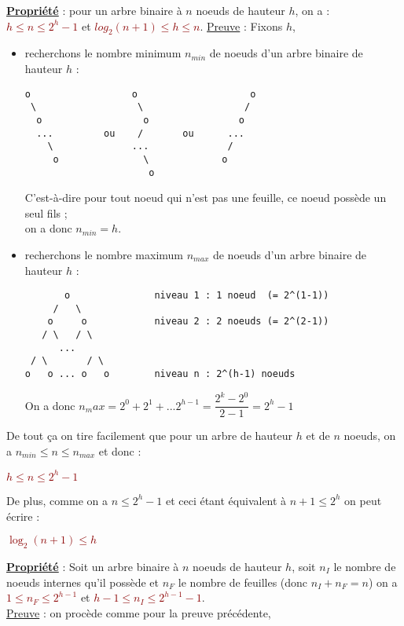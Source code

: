 \documentclass{article}
\newcommand{\red}[1]{\textcolor{darkred}{#1}}
\begin{document}
\noindent\textbf{\underline{Propriété}} : pour un arbre binaire à $n$ noeuds de hauteur $h$, on a : \red{$h\leq 
n\leq2^{h}-1$} et \red{$log_2(n+1)\leq h\leq n$}.
\underline{Preuve} : Fixons $h$,\\
\begin{itemize}
\item recherchons le nombre minimum $n_{min}$ de noeuds d'un arbre binaire de hauteur $h$ : 
\begin{lstlisting}
o                  o                    o
 \                  \                  /
  o                  o                o
  ...         ou    /       ou      ...
    \              ...              /
     o               \             o
                      o
\end{lstlisting}
C'est-à-dire pour tout noeud qui n'est pas une feuille, ce noeud possède un seul fils ; \\on a donc $n_{min}=h$.
\item recherchons le nombre maximum $n_{max}$ de noeuds d'un arbre binaire de hauteur $h$ : 
\begin{lstlisting}
       o               niveau 1 : 1 noeud  (= 2^(1-1))
     /   \
    o     o            niveau 2 : 2 noeuds (= 2^(2-1))
   / \   / \
      ...
 / \       / \ 
o   o ... o   o        niveau n : 2^(h-1) noeuds
\end{lstlisting}

On a donc $n_max = 2^0+2^1+...2^{h-1} = \dfrac{2^k-2^0}{2-1} = 2^h-1$
\end{itemize}

\noindent De tout ça on tire facilement que pour un arbre de hauteur $h$ et de $n$ noeuds, on a $n_{min} \leq n 
\leq n_{max}$ et donc : \red{\begin{center}$\boxed{h \leq n \leq 2^{h}-1}$\end{center}}
De plus, comme on a $n\leq 2^h-1$ et ceci étant équivalent à $n+1 \leq 2^h$ on peut écrire :  
\red{\begin{center}$\boxed{\log_2{(n+1)} \leq h}$\end{center}}

\noindent\textbf{\underline{Propriété}} : Soit un arbre binaire à $n$ noeuds de hauteur $h$, soit $n_I$ le 
nombre de noeuds internes qu'il possède et $n_F$ le nombre de feuilles (donc $n_I+n_F=n$) on a \red{$1\leq 
n_F\leq 2^{h-1}$} et \red{$h-1 \leq n_I \leq 2^{h-1} -1$}.\\
\underline{Preuve} : on procède comme pour la preuve précédente, \\
\end{document}
